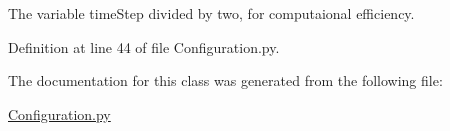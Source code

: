 The variable time\-Step divided by two, for computaional efficiency. 



Definition at line 44 of file Configuration.\-py.



The documentation for this class was generated from the following file\-:\begin{DoxyCompactItemize}
\item 
\hyperlink{_configuration_8py}{Configuration.\-py}\end{DoxyCompactItemize}
